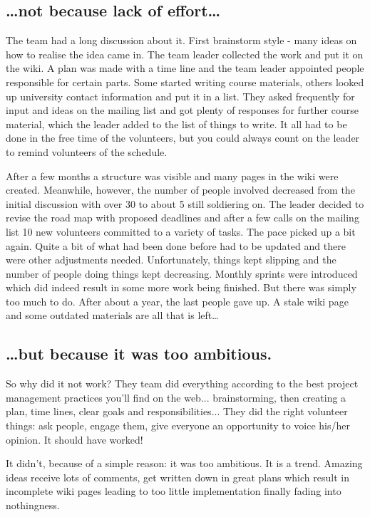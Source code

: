 \subsection*{\dots not because lack of effort\dots}
The team had a long discussion about it. First brainstorm style - many ideas on how to realise the idea came in. The team leader collected the work and put it on the wiki. A plan was made with a time line and the team leader appointed people responsible for certain parts. Some started writing  course materials, others looked up university contact information and put it in a list. They asked frequently for input and ideas on the mailing list and got plenty of responses for further course material, which the leader added to the list of things to write. It all had to be done in the free time of the volunteers, but you could always count on the leader to remind volunteers of the schedule.

After a few months a structure was visible and many pages in the wiki were created. Meanwhile, however, the number of people involved decreased from the initial discussion with over 30 to about 5 still soldiering on. The leader decided to revise the road map with proposed deadlines and after a few calls on the mailing list 10 new volunteers committed to a variety of tasks. The pace picked up a bit again. Quite a bit of what had been done before had to be updated and there were other adjustments needed. Unfortunately, things kept slipping and the number of people doing things kept decreasing. Monthly sprints were introduced which did indeed result in some more work being finished. But there was simply too much to do. After about a year, the last people gave up. A stale wiki page and some outdated materials are all that is left\dots

\subsection*{\dots but because it was too ambitious.}
So why did it not work? They team did everything according to the best project management practices you'll find on the web... brainstorming, then creating a plan, time lines, clear goals and responsibilities... They did the right volunteer things: ask people, engage them, give everyone an opportunity to voice his/her opinion. It should have worked!

It didn't, because of a simple reason: it was too ambitious. It is a trend. Amazing ideas receive lots of comments, get written down in great plans which result in incomplete wiki pages leading to too little implementation finally fading into nothingness.

